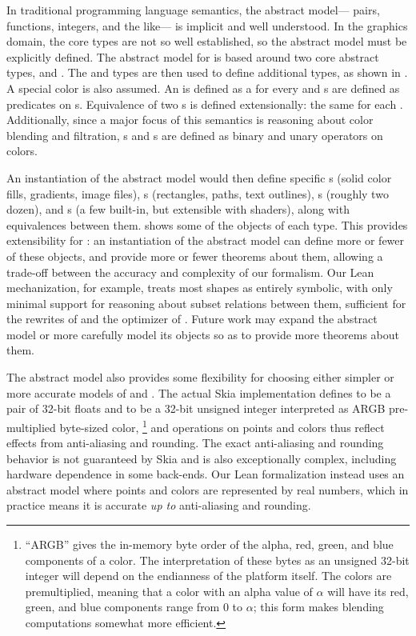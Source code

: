 In traditional programming language semantics,
  the abstract model---%
  pairs, functions, integers, and the like---%
  is implicit and well understood.
In the graphics domain, the core types
  are not so well established,
  so the abstract model must be explicitly defined.
The abstract model for \muskia
  is based around two core abstract types,
  \Point and \Color.
The \Point and \Color types
  are then used to define additional types,
  as shown in .
A special \Transparent color is also assumed.
An \Image is defined
  as a \Color for every \Point
  and \Shape{}s are defined
  as predicates on \Point{}s.
Equivalence of two \Image{}s is defined extensionally:
  the same \Color for each \Point.
Additionally, since a major focus of this semantics
  is reasoning about color blending and filtration,
  \Blend{}s and \Filter{}s are defined
  as binary and unary operators on colors.

An instantiation of the abstract model
  would then define specific \Image{}s
  (solid color fills, gradients, image files),
  \Shape{}s (rectangles, paths, text outlines),
  \Blend{}s (roughly two dozen),
  and \Filter{}s (a few built-in, but extensible with shaders),
  along with equivalences between them.
 shows some of the objects of each type.
This provides extensibility for \muskia:
  an instantiation of the abstract model
  can define more or fewer of these objects,
  and provide more or fewer theorems about them,
  allowing a trade-off between the accuracy and complexity
  of our formalism.
Our Lean mechanization, for example,
  treats most shapes as entirely symbolic,
  with only minimal support for reasoning about
  subset relations between them,
  sufficient for the rewrites of 
  and the optimizer of .
Future work may expand the abstract model
  or more carefully model its objects
  so as to provide more theorems about them.

The abstract model also provides some flexibility
  for choosing either simpler or more accurate
  models of \Point and \Color.
The actual Skia implementation
  defines \Point to be a pair of 32-bit floats
  and \Color to be a 32-bit unsigned integer
  interpreted as ARGB pre-multiplied byte-sized color,%
\footnote{
``ARGB'' gives the in-memory byte order
  of the alpha, red, green, and blue components of a color.
The interpretation of these bytes as an unsigned 32-bit integer
  will depend on the endianness of the platform itself.
The colors are premultiplied, meaning
  that a color with an alpha value of $\alpha$
  will have its red, green, and blue components
  range from $0$ to $\alpha$;
  this form makes blending computations somewhat more efficient.
}
  and operations on points and colors
  thus reflect effects from anti-aliasing and rounding.
The exact anti-aliasing and rounding behavior
  is not guaranteed by Skia
  and is also exceptionally complex,
  including hardware dependence in some back-ends.
Our Lean formalization instead uses an abstract model
  where points and colors are represented by real numbers,
  which in practice means it is accurate
  \emph{up to} anti-aliasing and rounding.

